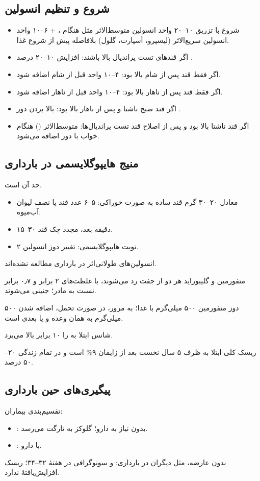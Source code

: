 \documentclass[12pt,a4paper]{article}
\begin{document}
\subsection*{شروع و تنظیم انسولین}
\begin{itemize}
\item شروع با تزریق ۱۰--۲۰ واحد انسولین متوسط‌الاثر مثل  هنگام ، + ۶--۱۰ واحد انسولین سریع‌الاثر (لیسپرو، آسپارت، گلول) بلافاصله پیش از شروع غذا.
\item اگر قندهای تست پراندیال بالا باشند: افزایش ۱۰--۲۰ درصد .
\item اگر فقط قند پس از شام بالا بود: ۴--۱۰ واحد  قبل از شام اضافه شود.
\item اگر فقط قند پس از ناهار بالا بود: ۴--۱۰ واحد  قبل از ناهار اضافه شود.
\item اگر قند صبح ناشتا و پس از ناهار بالا بود: بالا بردن دوز .
\item اگر قند ناشتا بالا بود و پس از اصلاح قند تست پراندیال‌ها: متوسط‌الاثر () هنگام خواب با دوز  اضافه می‌شود.
\end{itemize}
\subsection*{منیج هایپوگلایسمی در بارداری}
حد آن  است.
\begin{itemize}
\item معادل ۲۰--۳۰ گرم قند ساده به صورت خوراکی: ۵--۶ عدد قند یا نصف لیوان آب‌میوه.
\item ۱۵--۳۰ دقیقه بعد، مجدد چک قند.
\item ۲ نوبت هایپوگلایسمی: تغییر دوز انسولین.
\end{itemize}
انسولین‌های طولانی‌اثر در بارداری مطالعه نشده‌اند.

متفورمین و گلیبوراید هر دو از جفت رد می‌شوند، با غلظت‌های ۲ برابر و ۰٫۷ برابر نسبت به مادر؛ جنینی می‌شوند.

دوز متفورمین ۵۰۰ میلی‌گرم با غذا؛ به مرور، در صورت تحمل، اضافه شدن ۵۰۰ میلی‌گرم به همان وعده و یا بعدی است.

 شانس ابتلا به  را ۱۰ برابر بالا می‌برد.

ریسک کلی ابتلا به  ظرف ۵ سال نخست بعد از زایمان ۹\% است و در تمام زندگی ۲۰--۵۰ درصد.
\subsection*{پیگیری‌های حین بارداری}
تقسیم‌بندی بیماران:
\begin{itemize}
\item {}: بدون نیاز به دارو؛ گلوکز به تارگت می‌رسد.
\item {}: با دارو.
\end{itemize}
 بدون عارضه، مثل دیگران در بارداری:  و سونوگرافی در هفتهٔ ۳۲--۳۴؛ ریسک افزایش‌یافتهٔ  ندارد.
\end{document}
